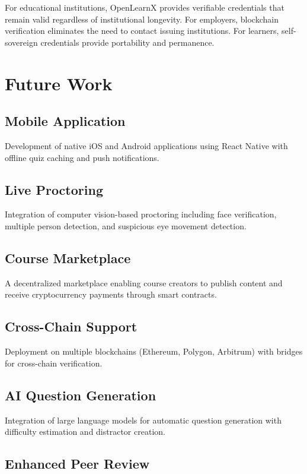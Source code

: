 \documentclass[conference]{IEEEtran}
\begin{document}
For educational institutions, OpenLearnX provides verifiable credentials that remain valid regardless of institutional longevity. For employers, blockchain verification eliminates the need to contact issuing institutions. For learners, self-sovereign credentials provide portability and permanence.

\section{Future Work}

\subsection{Mobile Application}

Development of native iOS and Android applications using React Native with offline quiz caching and push notifications.

\subsection{Live Proctoring}

Integration of computer vision-based proctoring including face verification, multiple person detection, and suspicious eye movement detection.

\subsection{Course Marketplace}

A decentralized marketplace enabling course creators to publish content and receive cryptocurrency payments through smart contracts.

\subsection{Cross-Chain Support}

Deployment on multiple blockchains (Ethereum, Polygon, Arbitrum) with bridges for cross-chain verification.

\subsection{AI Question Generation}

Integration of large language models for automatic question generation with difficulty estimation and distractor creation.

\subsection{Enhanced Peer Review}
\end{document}
